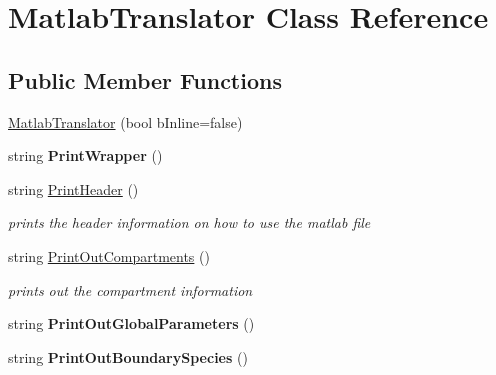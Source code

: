 \hypertarget{class_matlab_translator}{\section{Matlab\-Translator Class Reference}
\label{class_matlab_translator}
}
\subsection*{Public Member Functions}
\begin{DoxyCompactItemize}
\item 
\hyperlink{class_matlab_translator_a08f25f35cfda40bb37ecb02853bd8f8b}{Matlab\-Translator} (bool b\-Inline=false)
\item 
\hypertarget{class_matlab_translator_afc33045f701805c197c3f87fcc62e8d1}{string {\bfseries Print\-Wrapper} ()}\label{class_matlab_translator_afc33045f701805c197c3f87fcc62e8d1}

\item 
\hypertarget{class_matlab_translator_a92588826909e459ca11796eb0490e92e}{string \hyperlink{class_matlab_translator_a92588826909e459ca11796eb0490e92e}{Print\-Header} ()}\label{class_matlab_translator_a92588826909e459ca11796eb0490e92e}

\begin{DoxyCompactList}\small\item\em prints the header information on how to use the matlab file \end{DoxyCompactList}\item 
\hypertarget{class_matlab_translator_a9d7809067dd014a367c5c52c98376eb2}{string \hyperlink{class_matlab_translator_a9d7809067dd014a367c5c52c98376eb2}{Print\-Out\-Compartments} ()}\label{class_matlab_translator_a9d7809067dd014a367c5c52c98376eb2}

\begin{DoxyCompactList}\small\item\em prints out the compartment information \end{DoxyCompactList}\item 
\hypertarget{class_matlab_translator_aea05d08a895eff4b3f0e22aa9d54fb71}{string {\bfseries Print\-Out\-Global\-Parameters} ()}\label{class_matlab_translator_aea05d08a895eff4b3f0e22aa9d54fb71}

\item 
\hypertarget{class_matlab_translator_a0c591bddf0a778ab8c85b9508ebcb9ea}{string {\bfseries Print\-Out\-Boundary\-Species} ()}\label{class_matlab_translator_a0c591bddf0a778ab8c85b9508ebcb9ea}


\end{DoxyCompactItemize}
